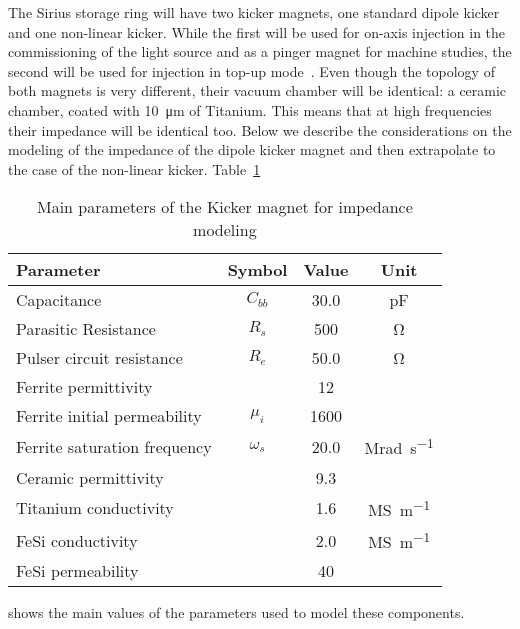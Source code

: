     The Sirius storage ring will have two kicker magnets, one standard dipole kicker and one non-linear kicker. While the first will be used for on-axis injection in the commissioning of the light source and as a pinger magnet for machine studies, the second will be used for injection in top-up mode~\cite{Liu2016a}. Even though the topology of both magnets is very different, their vacuum chamber will be identical: a ceramic chamber, coated with \SI{10}{\micro\meter} of Titanium. This means that at high frequencies their impedance will be identical too. Below we describe the considerations on the modeling of the impedance of the dipole kicker magnet and then extrapolate to the case of the non-linear kicker. Table~\ref{tab:kicker_paramters}
    \begin{table}[b]
        \centering
        \caption{Main parameters of the Kicker magnet for impedance modeling}
        \label{tab:kicker_paramters}
        \begin{tabular}{lccc}
            \toprule
            Parameter                     & Symbol    & Value  & Unit \\
            \midrule
            Capacitance                   & $C_{bb}$  &  30.0  & \si{\pico\farad}\\
            Parasitic Resistance          & $R_s$     &  500   & \si{\ohm}\\
            Pulser circuit resistance     & $R_e$     &  50.0  & \si{\ohm}\\
            Ferrite permittivity          &           &   12   & \\
            Ferrite initial permeability  & $\mu_i$   &  1600  & \\
            Ferrite saturation frequency  & $\omega_s$&  20.0  & \si{\mega\radian\per\second}\\
            Ceramic permittivity          &           &  9.3   & \\
            Titanium conductivity         &           &  1.6   & \si{\mega\siemens\per\meter}\\
            FeSi conductivity             &           &  2.0   & \si{\mega\siemens\per\meter}\\
            FeSi permeability             &           & 40     & \\
            \bottomrule
        \end{tabular}
    \end{table}
    shows the main values of the parameters used to model these components.

